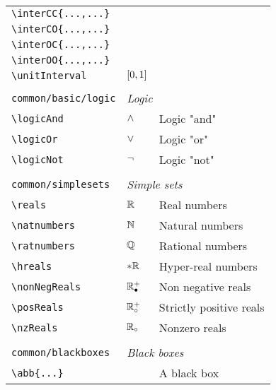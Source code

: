 \begin{longtable}{lll}
 {\color[rgb]{0.5,0.5,0.5}\texttt{\textbackslash interCC\{...,...\}}} &  & \\ 
 {\color[rgb]{0.5,0.5,0.5}\texttt{\textbackslash interCO\{...,...\}}} &  & \\ 
 {\color[rgb]{0.5,0.5,0.5}\texttt{\textbackslash interOC\{...,...\}}} &  & \\ 
 {\color[rgb]{0.5,0.5,0.5}\texttt{\textbackslash interOO\{...,...\}}} &  & \\ 
 {\color[rgb]{0.5,0.5,0.5}\texttt{\textbackslash unitInterval}} & $[0,1]$ & \\ 
  &  & \\ 
 {\color[rgb]{0.5,0.5,0.5}\texttt{common/basic/logic}} & \multicolumn{2}{l}{\emph{Logic}}\\ 
 \hline
{\color[rgb]{0.5,0.5,0.5}\texttt{\textbackslash logicAnd}} & $\wedge$ &  Logic "and"\\ 
 {\color[rgb]{0.5,0.5,0.5}\texttt{\textbackslash logicOr}} & $\vee$ &  Logic "or"\\ 
 {\color[rgb]{0.5,0.5,0.5}\texttt{\textbackslash logicNot}} & $\neg$ &  Logic "not"\\ 
  &  & \\ 
 {\color[rgb]{0.5,0.5,0.5}\texttt{common/simplesets}} & \multicolumn{2}{l}{\emph{Simple sets}}\\ 
 \hline
{\color[rgb]{0.5,0.5,0.5}\texttt{\textbackslash reals}} & $\mathbb{R}$ &  Real numbers\\ 
 {\color[rgb]{0.5,0.5,0.5}\texttt{\textbackslash natnumbers}} & $\mathbb{N}$ &  Natural numbers\\ 
 {\color[rgb]{0.5,0.5,0.5}\texttt{\textbackslash ratnumbers}} & $\mathbb{Q}$ &  Rational numbers\\ 
 {\color[rgb]{0.5,0.5,0.5}\texttt{\textbackslash hreals}} & $\ast\mathbb{R}$ &  Hyper-real numbers\\ 
 {\color[rgb]{0.5,0.5,0.5}\texttt{\textbackslash nonNegReals}} & $\mathbb{R}^{+}_{\bullet}$ &  Non negative reals \\ 
 {\color[rgb]{0.5,0.5,0.5}\texttt{\textbackslash posReals}} & $\mathbb{R}^{+}_{\circ}$ &  Strictly positive reals\\ 
 {\color[rgb]{0.5,0.5,0.5}\texttt{\textbackslash nzReals}} & $\mathbb{R}_{\circ}$ &  Nonzero reals\\ 
  &  & \\ 
 {\color[rgb]{0.5,0.5,0.5}\texttt{common/blackboxes}} & \multicolumn{2}{l}{\emph{Black boxes}}\\ 
 \hline
{\color[rgb]{0.5,0.5,0.5}\texttt{\textbackslash abb\{...\}}} &  &  A black box\\ 

\end{longtable}
